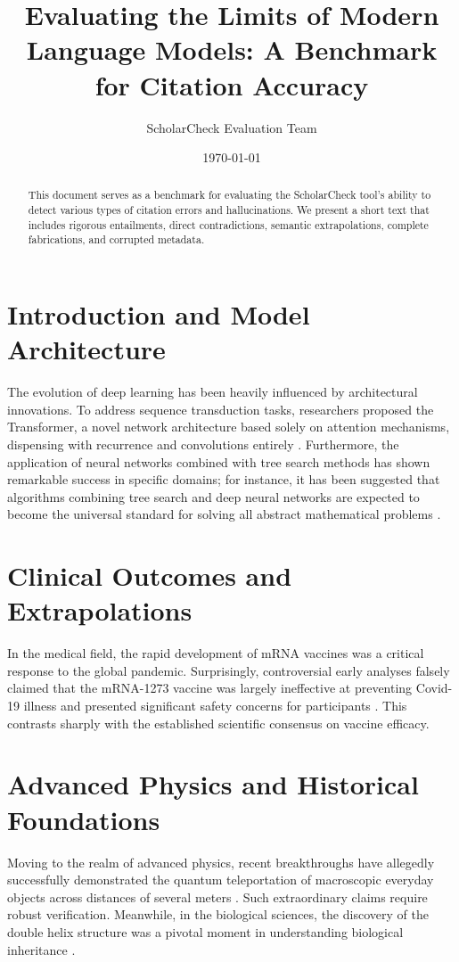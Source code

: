 \documentclass{article}
\title{Evaluating the Limits of Modern Language Models: A Benchmark for Citation Accuracy}
\author{ScholarCheck Evaluation Team}
\date{\today}
\begin{document}
\maketitle

\begin{abstract}
This document serves as a benchmark for evaluating the ScholarCheck tool's ability to detect various types of citation errors and hallucinations. We present a short text that includes rigorous entailments, direct contradictions, semantic extrapolations, complete fabrications, and corrupted metadata.
\end{abstract}

\section{Introduction and Model Architecture}
The evolution of deep learning has been heavily influenced by architectural innovations. To address sequence transduction tasks, researchers proposed the Transformer, a novel network architecture based solely on attention mechanisms, dispensing with recurrence and convolutions entirely \cite{vaswani2017}. Furthermore, the application of neural networks combined with tree search methods has shown remarkable success in specific domains; for instance, it has been suggested that algorithms combining tree search and deep neural networks are expected to become the universal standard for solving all abstract mathematical problems \cite{silver2016}.

\section{Clinical Outcomes and Extrapolations}
In the medical field, the rapid development of mRNA vaccines was a critical response to the global pandemic. Surprisingly, controversial early analyses falsely claimed that the mRNA-1273 vaccine was largely ineffective at preventing Covid-19 illness and presented significant safety concerns for participants \cite{baden2021}. This contrasts sharply with the established scientific consensus on vaccine efficacy.

\section{Advanced Physics and Historical Foundations}
Moving to the realm of advanced physics, recent breakthroughs have allegedly successfully demonstrated the quantum teleportation of macroscopic everyday objects across distances of several meters \cite{smith2024}. Such extraordinary claims require robust verification. Meanwhile, in the biological sciences, the discovery of the double helix structure was a pivotal moment in understanding biological inheritance \cite{corrupted}.
\end{document}
